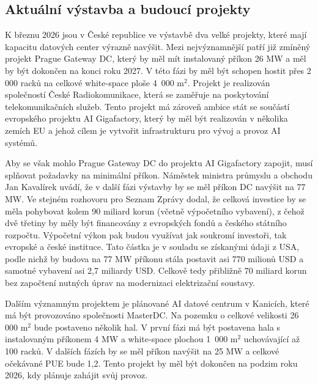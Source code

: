 \subsection{Aktuální výstavba a budoucí projekty}
\label{subsec:cz_trh_budoucnost}

K březnu 2026 jsou v České republice ve výstavbě dva velké projekty, které mají kapacitu datových center výrazně navýšit. Mezi nejvýznamnější patří již zmíněný projekt Prague Gateway DC, který by měl mít instalovaný příkon 26 MW a měl by být dokončen na konci roku 2027. V této fázi by měl být schopen hostit přes 2 000 racků na celkové white-space ploše 4~000 m$^2$. Projekt je realizován společností České Radiokomunikace, která se zaměřuje na poskytování telekomunikačních služeb. Tento projekt má zároveň ambice stát se součástí evropského projektu AI Gigafactory, který by měl být realizován v několika zemích EU a jehož cílem je vytvořit infrastrukturu pro vývoj a provoz AI systémů. \cite{cra_ceske_2025, prochazka_sef_2026}

Aby se však mohlo Prague Gateway DC do projektu AI Gigafactory zapojit, musí splňovat požadavky na minimální příkon. Náměstek ministra průmyslu a obchodu Jan Kavalírek uvádí, že v další fázi výstavby by se měl příkon DC navýšit na 77 MW. Ve stejném rozhovoru pro Seznam Zprávy dodal, že celková investice by se měla pohybovat kolem 90 miliard korun (včetně výpočetního vybavení), z čehož dvě třetiny by měly být financovány z evropských fondů a českého státního rozpočtu. Výpočetní výkon pak budou využívat jak soukromí investoři, tak evropské a české instituce. \cite{cra_ceske_2025, prochazka_sef_2026} Tato částka je v souladu se získanými údaji z USA, podle nichž by budova na 77 MW příkonu stála postavit asi 770 milionů USD a samotné vybavení asi 2,7 miliardy USD. Celkově tedy přibližně 70 miliard korun bez započtení nutných úprav na modernizaci elektrizační soustavy.

Dalším významným projektem je plánované AI datové centrum v Kanicích, které má být provozováno společnosti MasterDC. Na pozemku o celkové velikosti 26 000 m$^2$ bude postaveno několik hal. V první fázi má být postavena hala s instalovaným příkonem 4 MW a white-space plochou 1~000 m$^2$ uchovávající až 100 racků. V dalších fázích by se měl příkon navýšit na 25 MW a celkové očekávané PUE bude 1,2. Tento projekt by měl být dokončen na podzim roku 2026, kdy plánuje zahájit svůj provoz. \cite{rabasova_u_2025}

